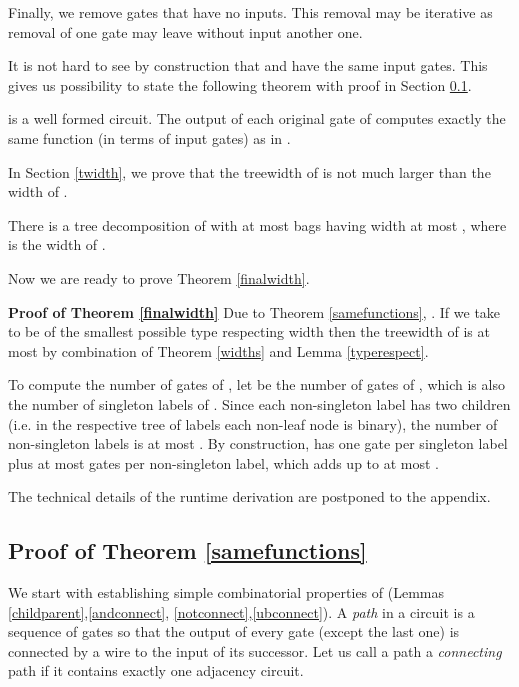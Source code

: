 \documentclass{llncs}
\begin{document}
Finally, we remove  gates that have no inputs.
This removal may be iterative as removal of one gate may leave without input another one.


It is not hard to see by construction that  and  have the same input gates.
This gives us possibility to state the following theorem with proof in Section \ref{samef}.

\begin{theorem} \label{samefunctions}
 is a well formed circuit.
The output of each original gate  of   computes exactly the same function (in terms of input gates)
 as in . 
\end{theorem}

In Section \ref{twidth}, we prove that the treewidth of  is not much larger than the width of
.

\begin{theorem} \label{widths}
There is a tree decomposition of  with at most  bags having width at most , where  is the width of . 
\end{theorem}

Now we are ready to prove Theorem \ref{finalwidth}.

{\bf Proof of Theorem \ref{finalwidth}} 
Due to Theorem \ref{samefunctions}, . If we take  to be of the smallest possible
type respecting width then the treewidth of  is at most  by combination of Theorem \ref{widths} and Lemma \ref{typerespect}.

To compute the number of gates of , let  be the number of gates of , which is also the number of
singleton labels of . Since each non-singleton label has two children (i.e. in the respective
tree of labels each non-leaf node is binary), the number of non-singleton labels is at most .
By construction,  has one gate per singleton label plus at most  gates per non-singleton label,
which adds up to at most .

The technical details of the runtime derivation are postponed to the appendix.
\begin{comment}
The key aspect is the data structure used for representation of the clique decomposition 
. Instead of associating each node of  with a graph, the node is associated 
with the corresponding operation that creates the graph. 
We show that, given this representation, the desired tree decomposition can be constructed in 
 per node of . Then we show that  contains  nodes, 
immediately implying the desired  bound on the runtime.
\end{comment}


\subsection{Proof of Theorem \ref{samefunctions}} \label{samef}
We start with establishing simple combinatorial properties of  (Lemmas \ref{childparent},\ref{andconnect},
\ref{notconnect},\ref{ubconnect}). 
A \emph{path} in a circuit is a sequence of gates so that the output of every gate (except the last one) is connected by a wire to the input of its successor. 
Let us call a path a \emph{connecting} path if it contains exactly one adjacency circuit.
\end{document}
